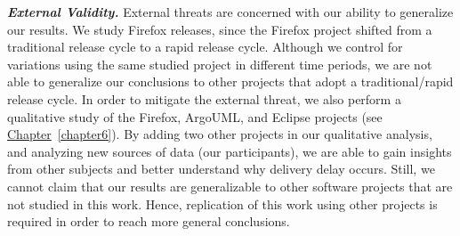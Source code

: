 \textbf{\textit{External Validity.}} External threats are concerned with our
ability to generalize our results. We study Firefox releases, since the Firefox
project shifted from a traditional release cycle to a rapid release cycle.
Although we control for variations using the same studied project in different
time periods, we are not able to generalize our conclusions to other projects
that adopt a traditional/rapid release cycle.  In order to mitigate the external
threat, we also perform a qualitative study of the Firefox, ArgoUML, and Eclipse
projects (see \hyperref[chapter6]{Chapter}~\ref{chapter6}). By adding two other
projects in our qualitative analysis, and analyzing new sources of data (our
participants), we are able to gain insights from other subjects and better
understand why delivery delay occurs. Still, we cannot claim that our results
are generalizable to other software projects that are not studied in this work.
Hence, replication of this work using other projects is required in order to
reach more general conclusions.

